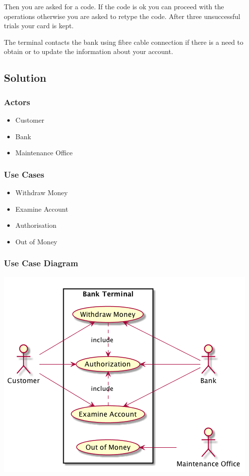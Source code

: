 \documentclass[11pt]{article}
\begin{document}
Then you are asked for a code. If the code is ok you can proceed with the operations
otherwise you are asked to retype the code. After three unsuccessful trials your card is kept.

The terminal contacts the bank using fibre cable connection if there is a need to obtain or to
update the information about your account.
\subsection{Solution}
\label{sec:orgheadline17}
\subsubsection{Actors}
\label{sec:orgheadline8}
\begin{itemize}
\item Customer
\item Bank
\item Maintenance Office
\end{itemize}
\subsubsection{Use Cases}
\label{sec:orgheadline9}
\begin{itemize}
\item Withdraw Money
\item Examine Account
\item Authorisation
\item Out of Money
\end{itemize}
\subsubsection{Use Case Diagram}
\label{sec:orgheadline10}
\includegraphics[width=.9\linewidth]{FUCD-20160109_SOLVED.png}
\end{document}
